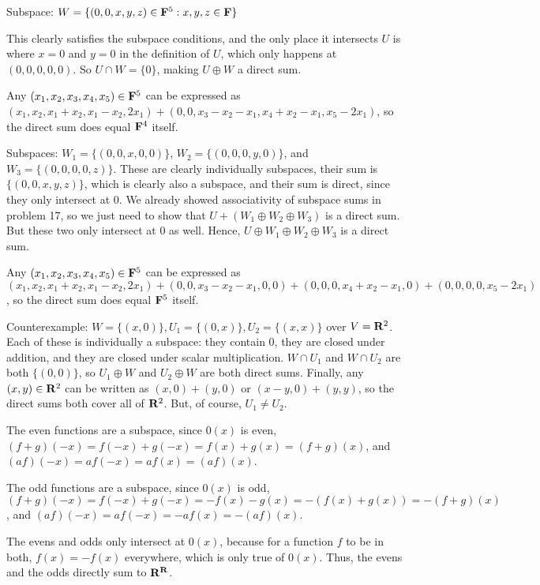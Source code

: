 \documentclass{article}
\begin{document}

Subspace: $W = \{(0, 0, x, y, z) \in \mathbf{F}^5 : x, y, z \in \mathbf{F} \}$

This clearly satisfies the subspace conditions, and the only place it intersects
$U$ is where $x = 0$ and $y = 0$ in the definition of $U$, which only happens at
$(0,0,0,0,0)$. So $U \cap W = \{0\}$, making $U \oplus W$ a direct sum.

Any $(x_1, x_2, x_3, x_4, x_5) \in \mathbf{F}^5$ can be expressed as $(x_1, x_2, x_1
+ x_2, x_1 - x_2, 2x_1) + (0, 0, x_3 - x_2 - x_1, x_4 + x_2 - x_1, x_5 - 2x_1)$,
so the direct sum does equal $\mathbf{F}^4$ itself.


Subspaces: $W_1 = \{(0,0,x,0,0)\}$, $W_2 = \{(0,0,0,y,0)\}$, and $W_3 =
\{(0,0,0,0,z)\}$. These are clearly individually subspaces, their sum is
$\{(0,0,x,y,z)\}$, which is clearly also a subspace, and their sum is direct,
since they only intersect at 0. We already showed associativity of subspace sums
in problem 17, so we just need to show that $U + (W_1 \oplus W_2 \oplus W_3)$ is
a direct sum. But these two only intersect at 0 as well. Hence, $U \oplus W_1
\oplus W_2 \oplus W_3$ is a direct sum.

Any $(x_1, x_2, x_3, x_4, x_5) \in \mathbf{F}^5$ can be expressed as $(x_1, x_2, x_1
+ x_2, x_1 - x_2, 2x_1) + (0, 0, x_3 - x_2 - x_1, 0, 0) + (0, 0, 0, x_4 + x_2 -
x_1, 0) + (0, 0, 0, 0, x_5 - 2x_1)$, so the direct sum does equal $\mathbf{F}^5$ itself.


Counterexample: $W = \{(x,0)\}, U_1 = \{(0,x)\}, U_2 = \{(x,x)\}$ over $V =
\mathbf{R}^2$. Each of these is individually a subspace: they contain 0, they are
closed under addition, and they are closed under scalar multiplication. $W \cap
U_1$ and $W \cap U_2$ are both $\{(0,0)\}$, so $U_1 \oplus W$ and $U_2 \oplus W$
are both direct sums. Finally, any $(x,y) \in \mathbf{R}^2$ can be written as $(x,0)
+ (y,0)$ or $(x-y,0) + (y,y)$, so the direct sums both cover all of $\mathbf{R}^2$.
But, of course, $U_1 \neq U_2$.


The even functions are a subspace, since $0(x)$ is even, $(f+g)(-x) = f(-x) +
g(-x) = f(x) + g(x) = (f+g)(x)$, and $(af)(-x) = af(-x) = af(x) = (af)(x)$.

The odd functions are a subspace, since $0(x)$ is odd, $(f+g)(-x) = f(-x) +
g(-x) = -f(x) - g(x) = -(f(x) + g(x)) = -(f+g)(x)$, and $(af)(-x) = af(-x) =
-af(x) = -(af)(x)$.

The evens and odds only intersect at $0(x)$, because for a function $f$ to be in
both, $f(x) = -f(x)$ everywhere, which is only true of $0(x)$. Thus, the evens
and the odds directly sum to $\mathbf{R}^{\mathbf{R}}$.
\end{document}
